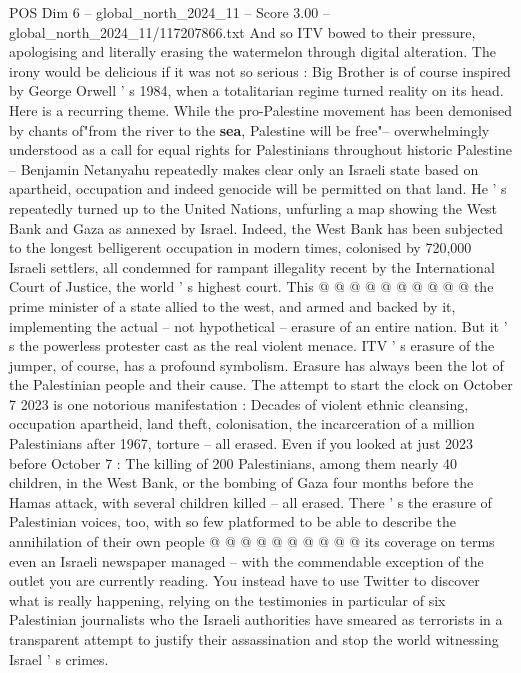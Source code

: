 \begin{textsample}{POS Dim 6 – global\_north\_2024\_11 – Score 3.00 – global\_north\_2024\_11/117207866.txt}  \label{ex:f6_pos_360}
And so ITV bowed to their pressure, apologising and literally erasing the watermelon through digital alteration.
The irony would be delicious if it was not so serious : Big Brother is of course inspired by George Orwell ' s 1984, when a totalitarian regime turned reality on its head.
Here is a recurring theme.
While the pro-Palestine movement has been demonised by chants of"from the river to the \textbf{sea}, Palestine will be free"-- overwhelmingly understood as a call for equal rights for Palestinians throughout historic Palestine -- Benjamin Netanyahu repeatedly makes clear only an Israeli state based on apartheid, occupation and indeed genocide will be permitted on that land.
He ' s repeatedly turned up to the United Nations, unfurling a map showing the West Bank and Gaza as annexed by Israel.
Indeed, the West Bank has been subjected to the longest belligerent occupation in modern times, colonised by 720,000 Israeli settlers, all condemned for rampant illegality recent by the International Court of Justice, the world ' s highest court.
This @ @ @ @ @ @ @ @ @ @ the prime minister of a state allied to the west, and armed and backed by it, implementing the actual -- not hypothetical -- erasure of an entire nation.
But it ' s the powerless protester cast as the real violent menace.
ITV ' s erasure of the jumper, of course, has a profound symbolism.
Erasure has always been the lot of the Palestinian people and their cause.
The attempt to start the clock on October 7 2023 is one notorious manifestation : Decades of violent ethnic cleansing, occupation apartheid, land theft, colonisation, the incarceration of a million Palestinians after 1967, torture -- all erased.
Even if you looked at just 2023 before October 7 : The killing of 200 Palestinians, among them nearly 40 children, in the West Bank, or the bombing of Gaza four months before the Hamas attack, with several children killed -- all erased.
There ' s the erasure of Palestinian voices, too, with so few platformed to be able to describe the annihilation of their own people @ @ @ @ @ @ @ @ @ @ its coverage on terms even an Israeli newspaper managed -- with the commendable exception of the outlet you are currently reading.
You instead have to use Twitter to discover what is really happening, relying on the testimonies in particular of six Palestinian journalists who the Israeli authorities have smeared as terrorists in a transparent attempt to justify their assassination and stop the world witnessing Israel ' s crimes.

\end{textsample}
